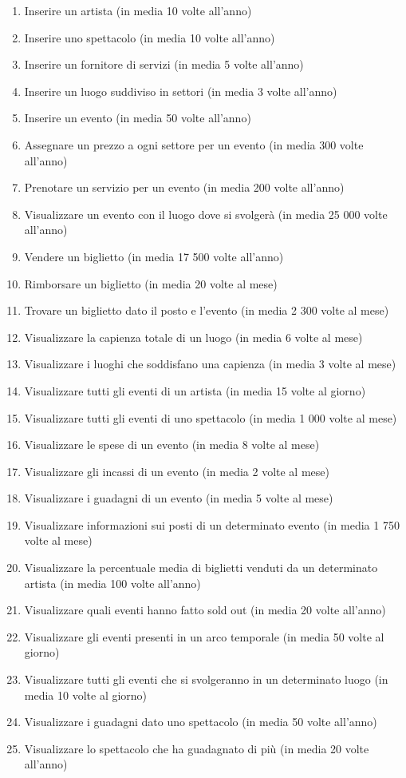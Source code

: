 \documentclass[a4paper,11pt]{article}
\begin{document}
\begin{enumerate}
    \item Inserire un artista (in media 10 volte all'anno)
    \item Inserire uno spettacolo (in media 10 volte all'anno)
    \item Inserire un fornitore di servizi (in media 5 volte all'anno)
    \item Inserire un luogo suddiviso in settori (in media 3 volte all'anno)
    \item \label{oploc1} Inserire un evento (in media 50 volte all'anno)
    \item \label{opsec1} Assegnare un prezzo a ogni settore per un evento (in media 300 volte all'anno)
    \item Prenotare un servizio per un evento (in media 200 volte all'anno)
    \item \label{oploc2} Visualizzare un evento con il luogo dove si svolgerà (in media 25 000 volte all'anno)
    \item Vendere un biglietto (in media 17 500 volte all'anno)
    \item Rimborsare un biglietto (in media 20 volte al mese)
    \item Trovare un biglietto dato il posto e l'evento (in media 2 300 volte al mese)
    \item Visualizzare la capienza totale di un luogo (in media 6 volte al mese)
    \item Visualizzare i luoghi che soddisfano una capienza (in media 3 volte al mese)
    \item \label{oploc3} Visualizzare tutti gli eventi di un artista (in media 15 volte al giorno)
    \item Visualizzare tutti gli eventi di uno spettacolo (in media 1 000 volte al mese)
    \item \label{oploc4} Visualizzare le spese di un evento (in media 8 volte al mese)
    \item Visualizzare gli incassi di un evento (in media 2 volte al mese)
    \item \label{oploc5} Visualizzare i guadagni di un evento (in media 5 volte al mese)
    \item Visualizzare informazioni sui posti di un determinato evento (in media 1 750 volte al mese)
    \item Visualizzare la percentuale media di biglietti venduti da un determinato artista (in media 100 volte all'anno)
    \item Visualizzare quali eventi hanno fatto sold out (in media 20 volte all'anno)
    \item Visualizzare gli eventi presenti in un arco temporale (in media 50 volte al giorno)
    \item Visualizzare tutti gli eventi che si svolgeranno in un determinato luogo (in media 10 volte al giorno)
    \item Visualizzare i guadagni dato uno spettacolo (in media 50 volte all'anno)
    \item Visualizzare lo spettacolo che ha guadagnato di più (in media 20 volte all'anno)
\end{enumerate}
\end{document}

